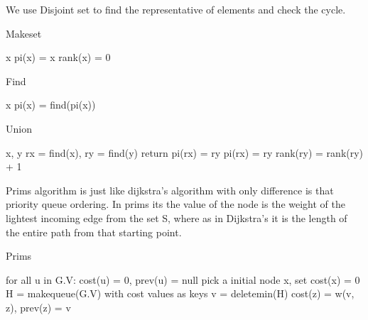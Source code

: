 \documentclass[11pt,letterpaper]{article}
\begin{document}
We use Disjoint set to find the representative of elements and check the cycle. 
\begin{algorithm}
	\algrenewcommand{}
	\caption{Makeset}
	\label{alg:Makeset}
	\begin{algorithmic}[1]
		\Require x
		\State pi(x) = x
		\State rank(x) = 0
	\end{algorithmic}
\end{algorithm}


\begin{algorithm}
	\algrenewcommand{}
	\caption{Find}
	\label{alg:Find}
	\begin{algorithmic}[1]
		\Require x
		\State pi(x) = find(pi(x))
		\EndIf
	\end{algorithmic}
\end{algorithm}


\begin{algorithm}
	\algrenewcommand{}
	\caption{Union}
	\label{alg:Union}
	\begin{algorithmic}[1]
		\Require x, y
		\State rx = find(x), ry = find(y)
		\State return
		\EndIf
			\State pi(rx) = ry
		\Else
			\State pi(rx) = ry
			 rank(ry) = rank(ry) + 1
			\EndIf
		\EndIf
	\end{algorithmic}
\end{algorithm}


Prims algorithm is just like dijkstra's algorithm with only difference is that priority queue ordering. In prims its the value of the node is the weight of the lightest incoming edge from the set S, where as in Dijkstra's it is the length of the entire path from that starting point. 

\begin{algorithm}
	\caption{Prims}
	\label{alg:}
	\begin{algorithmic}[1]
		\State for all u in G.V: cost(u) = 0, prev(u) = null
		\State pick a initial node x, set cost(x) = 0
		\State H = makequeue(G.V) with cost values as keys
			\State v = deletemin(H)
				cost(z) = w(v, z), prev(z) = v
				\EndIf
			\EndFor
		\EndWhile
	\end{algorithmic}
\end{algorithm}
\end{document}
